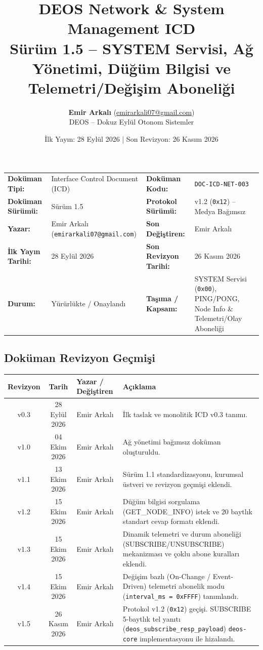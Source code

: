 \documentclass[a4paper,10pt]{article}
\title{\textbf{DEOS Network \& System Management ICD}\\
\large Sürüm 1.5 -- SYSTEM Servisi, Ağ Yönetimi, Düğüm Bilgisi ve Telemetri/Değişim Aboneliği}
\author{\textbf{Emir Arkalı} (\href{mailto:emirarkali07@gmail.com}{emirarkali07@gmail.com})\\DEOS -- Dokuz Eylül Otonom Sistemler}
\date{İlk Yayın: 28 Eylül 2026 \quad | \quad Son Revizyon: 26 Kasım 2026}
\newcommand{\hex}[1]{\texttt{0x#1}}
\newcommand{\code}[1]{\texttt{#1}}
\begin{document}
\maketitle

\begin{center}
\small
\begin{tabularx}{\textwidth}{ll lX}
\toprule
\textbf{Doküman Tipi:} & Interface Control Document (ICD) & \textbf{Doküman Kodu:} & \code{DOC-ICD-NET-003} \\
\textbf{Doküman Sürümü:} & Sürüm 1.5 & \textbf{Protokol Sürümü:} & v1.2 (\hex{12}) -- Medya Bağımsız \\
\textbf{Yazar:} & Emir Arkalı (\texttt{emirarkali07@gmail.com}) & \textbf{Son Değiştiren:} & Emir Arkalı \\
\textbf{İlk Yayın Tarihi:} & 28 Eylül 2026 & \textbf{Son Revizyon Tarihi:} & 26 Kasım 2026 \\
\textbf{Durum:} & Yürürlükte / Onaylandı & \textbf{Taşıma / Kapsam:} & SYSTEM Servisi (\hex{00}), PING/PONG, Node Info \& Telemetri/Olay Aboneliği \\
\bottomrule
\end{tabularx}
\end{center}

\subsection*{Doküman Revizyon Geçmişi}
\begin{center}
\small
\begin{tabularx}{\textwidth}{c c l X}
\toprule
\textbf{Revizyon} & \textbf{Tarih} & \textbf{Yazar / Değiştiren} & \textbf{Açıklama} \\
\midrule
v0.3 & 28 Eylül 2026 & Emir Arkalı & İlk taslak ve monolitik ICD v0.3 tanımı. \\
v1.0 & 04 Ekim 2026 & Emir Arkalı & Ağ yönetimi bağımsız doküman oluşturuldu. \\
v1.1 & 13 Ekim 2026 & Emir Arkalı & Sürüm 1.1 standardizasyonu, kurumsal üstveri ve revizyon geçmişi eklendi. \\
v1.2 & 15 Ekim 2026 & Emir Arkalı & Düğüm bilgisi sorgulama (GET\_NODE\_INFO) istek ve 20 baytlık standart cevap formatı eklendi. \\
v1.3 & 15 Ekim 2026 & Emir Arkalı & Dinamik telemetri ve durum aboneliği (SUBSCRIBE/UNSUBSCRIBE) mekanizması ve çoklu abone kuralları eklendi. \\
v1.4 & 15 Ekim 2026 & Emir Arkalı & Değişim bazlı (On-Change / Event-Driven) telemetri abonelik modu (\code{interval\_ms = 0xFFFF}) tanımlandı. \\
v1.5 & 26 Kasım 2026 & Emir Arkalı & Protokol v1.2 (\hex{12}) geçişi. SUBSCRIBE 5-baytlık tel yanıtı (\code{deos\_subscribe\_resp\_payload}) \code{deos-core} implementasyonu ile hizalandı. \\
\bottomrule
\end{tabularx}
\end{center}
\vspace{0.8em}
\end{document}
